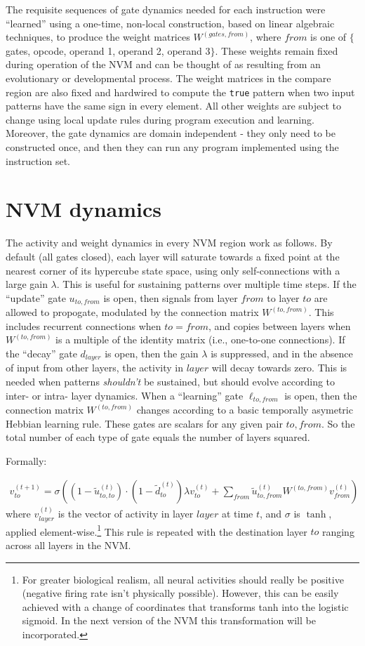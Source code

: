 \documentclass[pdftex,12pt,letterpaper]{article}
\begin{document}
The requisite sequences of gate dynamics needed for each instruction were ``learned'' using a one-time, non-local construction, based on linear algebraic techniques, to produce the weight matrices $W^{(gates, from)}$, where $from$ is one of $\{$gates, opcode, operand 1, operand 2, operand 3$\}$.  These weights remain fixed during operation of the NVM and can be thought of as resulting from an evolutionary or developmental process.  The weight matrices in the compare region are also fixed and hardwired to compute the \texttt{true} pattern when two input patterns have the same sign in every element.  All other weights are subject to change using local update rules during program execution and learning.  Moreover, the gate dynamics are domain independent - they only need to be constructed once, and then they can run any program implemented using the instruction set.

\section{NVM dynamics}

The activity and weight dynamics in every NVM region work as follows.  By default (all gates closed), each layer will saturate towards a fixed point at the nearest corner of its hypercube state space, using only self-connections with a large gain $\lambda$.  This is useful for sustaining patterns over multiple time steps.  If the ``update'' gate $u_{to,from}$ is open, then signals from layer $from$ to layer $to$ are allowed to propogate, modulated by the connection matrix $W^{(to,from)}$.  This includes recurrent connections when $to = from$, and copies between layers when $W^{(to,from)}$ is a multiple of the identity matrix (i.e., one-to-one connections).  If the ``decay'' gate $d_{layer}$ is open, then the gain $\lambda$ is suppressed, and in the absence of input from other layers, the activity in $layer$ will decay towards zero.  This is needed when patterns \emph{shouldn't} be sustained, but should evolve according to inter- or intra- layer dynamics.  When a ``learning'' gate $\ell_{to,from}$ is open, then the connection matrix $W^{(to,from)}$ changes according to a basic temporally asymetric Hebbian learning rule.  These gates are scalars for any given pair $to,from$.  So the total number of each type of gate equals the number of layers squared.

Formally:

\begin{align}
v^{(t+1)}_{to} = \sigma\left((1-\tilde{u}^{(t)}_{to,to})\cdot(1 - \tilde{d}^{(t)}_{to})\lambda v^{(t)}_{to} + \sum_{from}\tilde{u}^{(t)}_{to,from}W^{(to,from)}v^{(t)}_{from}\right)
\label{eq:actrule}
\end{align}
where $v^{(t)}_{layer}$ is the vector of activity in layer $layer$ at time $t$, and $\sigma$ is $\tanh$, applied element-wise.\footnote{For greater biological realism, all neural activities should really be positive (negative firing rate isn't physically possible).  However, this can be easily achieved with a change of coordinates that transforms tanh into the logistic sigmoid.  In the next version of the NVM this transformation will be incorporated.}  This rule is repeated with the destination layer $to$ ranging across all layers in the NVM.
\end{document}

